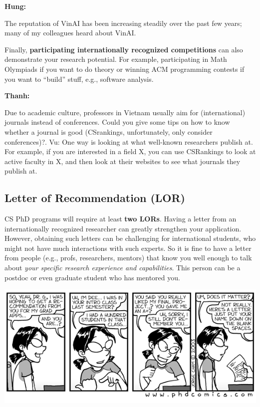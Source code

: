 \documentclass[11pt]{article}
\newenvironment{commentbox}[1][]{
\small
    \begin{mybox}
    {\small \textbf{#1}}
 }{
   \end{mybox}
}
\begin{document}
\begin{commentbox}[Hung:]
The reputation of VinAI has been increasing steadily over the past few years; many of my colleagues heard about VinAI.
\end{commentbox}

Finally, \textbf{participating internationally recognized competitions} can also demonstrate your research potential.
For example, participating in Math Olympiads if you want to do theory or  winning ACM programming contests if you want to ``build'' stuff, e.g., software analysis.

\begin{commentbox}[Thanh:]
Due to academic culture, professors in Vietnam usually aim for (international) journals instead of conferences. Could you give some tips on how to know whether a journal is good (CSrankings, unfortunately, only consider conferences)?.
\tcblower
Vu: One way is looking at what well-known researchers publish at. For example, if you are interested in a field X, you can use CSRankings to look at active faculty in X, and then look at their websites to see what journals they publish at.
\end{commentbox}

\subsection{Letter of Recommendation (LOR)}\label{sec:lor}

CS PhD programs will require at least \textbf{two LORs}. Having a letter from an internationally recognized researcher can greatly strengthen your application. However, obtaining such letters
can be challenging for international students, who might not have much interactions with such experts. So it is fine to have a letter from people (e.g., profs, researchers, mentors) that know you well enough to talk about \emph{your specific research experience and capabilities}. This person can be a postdoc or even graduate student who has mentored you.  

\begin{center}
\includegraphics[width=0.6\linewidth]{c6.png}
\end{center}
\end{document}
